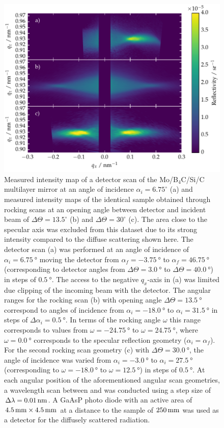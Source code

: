 \begin{figure}[htbp]
        \includegraphics[width=\textwidth]{img/PTB17_diffuse_scattering_multiple_geometries} \caption[Measured intensity map of a detector scan of the Mo/B$_4$C/Si/C sample.]{Measured intensity map of a detector scan of the Mo/B$_4$C/Si/C multilayer mirror at an angle of incidence $\alpha_i = 6.75^\circ$ (a) and measured intensity maps of the identical sample obtained through rocking scans at an opening angle between detector and incident beam of $\Delta \Theta = 13.5^\circ$ (b) and $\Delta \Theta = 30^\circ$ (c). The area close to the specular axis was excluded from this dataset due to its strong intensity compared to the diffuse scattering shown here. The detector scan (a) was performed at an angle of incidence of $\alpha_i = \SI{6.75}{\degree}$ moving the detector from $\alpha_f = \SI{-3.75}{\degree}$ to $\alpha_f = \SI{46.75}{\degree}$ (corresponding to detector angles from $\Delta \Theta = \SI{3.0}{\degree}$ to $\Delta \Theta = \SI{40.0}{\degree}$) in steps of $\SI{0.5}{\degree}$. The access to the negative $q_x$-axis in (a) was limited due clipping of the incoming beam with the detector. The angular ranges for the rocking scan (b) with opening angle $\Delta \Theta = \SI{13.5}{\degree}$ correspond to angles of incidence from $\alpha_i = \SI{-18.0}{\degree}$ to $\alpha_i = \SI{31.5}{\degree}$ in steps of $\Delta\alpha_i = \SI{0.5}{\degree}$. In terms of the rocking angle $\omega$ this range corresponds to values from $\omega = \SI{-24.75}{\degree}$ to $\omega = \SI{24.75}{\degree}$, where $\omega = \SI{0.0}{\degree}$ corresponds to the specular reflection geometry ($\alpha_i = \alpha_f$). For the second rocking scan geometry (c) with $\Delta \Theta = \SI{30.0}{\degree}$, the angle of incidence was varied from $\alpha_i = \SI{-3.0}{\degree}$ to $\alpha_i = \SI{27.5}{\degree}$ (corresponding to $\omega = \SI{-18.0}{\degree}$ to $\omega = \SI{12.5}{\degree}$) in steps of $\SI{0.5}{\degree}$. At each angular position of the aforementioned angular scan geometries, a wavelength scan between  and  was conducted using a step size of $\Delta \lambda = \nm{0.01}$.  A GaAsP photo diode with an active area of $\mm{4.5} \times \mm{4.5}$ at a distance to the sample of $\mm{250}$ was used as a detector for the diffusely scattered radiation.} \label{ch_diff:fig_PTB17_detector_and_rocking_maps}
\end{figure}
